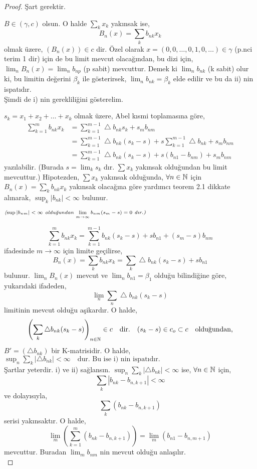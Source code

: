 \begin{proof}
Şart gerektir.

$B\in(\gamma,c)$ olsun. O halde $\sum_kx_k$ yakınsak ise,
$$
B_n(x)=\sum_kb_{nk}x_k
$$
olmak üzere, $(B_n(x))\in c$ dir. Özel olarak $x=(0,0,\ldots,0,1,0,\ldots)\in\gamma$ (p.nci terim 1 dir) için de bu limit mevcut olacağından, bu dizi için, $\lim_nB_n(x)=\lim_nb_{np}$ (p sabit) mevcuttur. Demek ki $\lim_nb_{nk}$ (k sabit) olur ki, bu limitin değerini $\beta_k$ ile gösterirsek, $\lim_nb_{nk}=\beta_k$ elde edilir ve bu da ii) nin ispatıdır.\\[5pt]

Şimdi de i) nin gerekliliğini gösterelim.

$s_k=x_1+x_2+\ldots+x_k$ olmak üzere, Abel kısmi toplamasına göre,
$$
\begin{aligned}
\sum\limits_{k=1}^mb_{nk}x_k&=\sum\limits_{k=1}^{m-1}\bigtriangleup b_{nk}s_k+s_mb_{nm}\\
&=\sum\limits_{k=1}^{m-1}\bigtriangleup b_{nk}(s_k-s)+s\sum\limits_{k=1}^{m-1}\bigtriangleup b_{nk}+s_mb_{nm}\\
&=\sum\limits_{k=1}^{m-1}\bigtriangleup b_{nk}(s_k-s)+s(b_{n1}-b_{nm})+s_mb_{nm}
\end{aligned}
$$
yazılabilir. (Burada $s=\lim_ks_k$ dır. $\sum x_k$ yakınsak olduğundan bu limit mevcuttur.) Hipotezden, $\sum x_k$ yakınsak olduğunda, $\forall n\in\natn$ için $B_n(x)=\sum\limits_kb_{nk}x_k$ yakınsak olacağına göre yardımcı teorem 2.1  dikkate alınarak, $\sup_k|b_{nk}|<\infty$ bulunur.

$_{\emph{($\sup|b_{nm}|<\infty$ \text{olduğundan} $\lim\limits_{m\to\infty}b_{nm}(s_m-s)=0$ \text{dır.})}}$

$$
\sum_{k=1}^mb_{nk}x_k=\sum_{k=1}^{m-1}b_{nk}(s_k-s)+sb_{n1}+(s_m-s)b_{nm}
$$
ifadesinde $m\to\infty$ için limite geçilirse,
$$
B_n(x)=\sum_kb_{nk}x_k=\sum_k\bigtriangleup b_{nk}(s_k-s)+sb_{n1}
$$
bulunur. $\lim_nB_n(x)$ mevcut ve $\lim_nb_{n1}=\beta_1$ olduğu bilindiğine göre, yukarıdaki ifadeden, $$\lim_n\sum_n\bigtriangleup b _{nk}(s_k-s)$$ limitinin mevcut olduğu aşikardır. O halde,
$$
\left(\sum_k\bigtriangleup b_{nk}(s_k-s)\right)_{n\in\natn}\in c \quad\text{dir.}\quad(s_k-s)\in\cs\subset c\quad\text{olduğundan,}
$$
$B'=(\bigtriangleup b_{nk})$ bir K-matrisidir. O halde,
$\sup_n\sum_k|\bigtriangleup b_{nk}|<\infty\quad\text{dur. Bu ise i) nin ispatıdır.}$\\[5pt]

Şartlar yeterdir. i) ve ii) sağlansın. $\sup_n\sum_k|\bigtriangleup b_{nk}|<\infty$ ise, $\forall n\in\natn$ için,
$$
\sum_k|b_{nk}-b_{n,k+1}|<\infty
$$
ve dolayısıyla,
$$
\sum_k(b_{nk}-b_{n,k+1})
$$
serisi yakınsaktır. O halde, 
$$
\lim_m\left(\sum_{k=1}^m(b_{nk}-b_{n,k+1})\right)=\lim_m(b_{n1}-b_{n,m+1})
$$
mevcuttur. Buradan $\lim_mb_{nm}$ nin mevcut olduğu anlaşılır. \\[5pt]


\end{proof}
